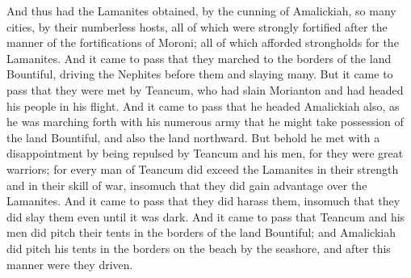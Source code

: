 \bverse \iffalse And thus had the Lamanites obtained, by the cunning of Amalickiah, so many cities, by their numberless hosts, all of which were strongly fortified after the manner of the fortifications of Moroni; all of which afforded strongholds for the Lamanites. \fi
And thus had the Lamanites obtained, by the cunning of Amalickiah, so many cities, by their numberless hosts, all of which were strongly fortified after the manner of the fortifications of Moroni; all of which afforded strongholds for the Lamanites.
\bverse \iffalse And it came to pass that they marched to the borders of the land Bountiful, driving the Nephites before them and slaying many. \fi
And it came to pass that they marched to the borders of the land Bountiful, driving the Nephites before them and slaying many.
\bverse \iffalse But it came to pass that they were met by Teancum, who had slain Morianton and had headed his people in his flight. \fi
But it came to pass that they were met by Teancum, who had slain Morianton and had headed his people in his flight.
\bverse \iffalse And it came to pass that he headed Amalickiah also, as he was marching forth with his numerous army that he might take possession of the land Bountiful, and also the land northward. \fi
And it came to pass that he headed Amalickiah also, as he was marching forth with his numerous army that he might take possession of the land Bountiful, and also the land northward.
\bverse \iffalse But behold he met with a disappointment by being repulsed by Teancum and his men, for they were great warriors; for every man of Teancum did exceed the Lamanites in their strength and in their skill of war, insomuch that they did gain advantage over the Lamanites. \fi
But behold he met with a disappointment by being repulsed by Teancum and his men, for they were great warriors; for every man of Teancum did exceed the Lamanites in their strength and in their skill of war, insomuch that they did gain advantage over the Lamanites.
\bverse \iffalse And it came to pass that they did harass them, insomuch that they did slay them even until it was dark. And it came to pass that Teancum and his men did pitch their tents in the borders of the land Bountiful; and Amalickiah did pitch his tents in the borders on the beach by the seashore, and after this manner were they driven. \fi
And it came to pass that they did harass them, insomuch that they did slay them even until it was dark. And it came to pass that Teancum and his men did pitch their tents in the borders of the land Bountiful; and Amalickiah did pitch his tents in the borders on the beach by the seashore, and after this manner were they driven.
